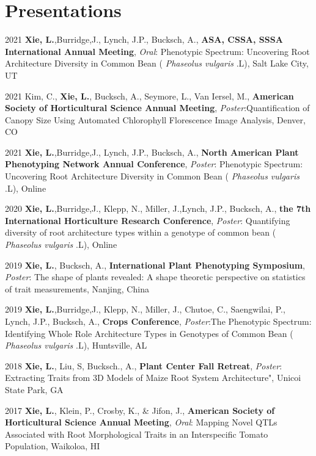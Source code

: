 \documentclass[11pt,a4paper,]{awesome-cv}
\begin{document}
\hypertarget{presentations}{%
\section{Presentations}\label{presentations}}

2021 \textbf{Xie, L.},Burridge,J., Lynch, J.P., Bucksch, A.,
\textbf{ASA, CSSA, SSSA International Annual Meeting}, \emph{Oral}:
Phenotypic Spectrum: Uncovering Root Architecture Diversity in Common
Bean ( \emph{Phaseolus vulgaris} .L), Salt Lake City, UT

2021 Kim, C., \textbf{Xie, L.}, Bucksch, A., Seymore, L., Van Iersel,
M., \textbf{American Society of Horticultural Science Annual Meeting},
\emph{Poster}:Quantification of Canopy Size Using Automated Chlorophyll
Florescence Image Analysis, Denver, CO

2021 \textbf{Xie, L.},Burridge,J., Lynch, J.P., Bucksch, A.,
\textbf{North American Plant Phenotyping Network Annual Conference},
\emph{Poster}: Phenotypic Spectrum: Uncovering Root Architecture
Diversity in Common Bean ( \emph{Phaseolus vulgaris} .L), Online

2020 \textbf{Xie, L.},Burridge,J., Klepp, N., Miller, J.,Lynch, J.P.,
Bucksch, A., \textbf{the 7th International Horticulture Research
Conference}, \emph{Poster}: Quantifying diversity of root architecture
types within a genotype of common bean ( \emph{Phaseolus vulgaris} .L),
Online

2019 \textbf{Xie, L.}, Bucksch, A., \textbf{International Plant
Phenotyping Symposium}, \emph{Poster}: The shape of plants revealed: A
shape theoretic perspective on statistics of trait measurements,
Nanjing, China

2019 \textbf{Xie, L.},Burridge,J., Klepp, N., Miller, J., Chutoe, C.,
Saengwilai, P., Lynch, J.P., Bucksch, A., \textbf{Crops Conference},
\emph{Poster}:The Phenotypic Spectrum: Identifying Whole Role
Architecture Types in Genotypes of Common Bean ( \emph{Phaseolus
vulgaris} .L), Huntsville, AL

2018 \textbf{Xie, L.}, Liu, S, Bucksch., A., \textbf{Plant Center Fall
Retreat}, \emph{Poster}: Extracting Traits from 3D Models of Maize Root
System Architecture", Unicoi State Park, GA

2017 \textbf{Xie, L.}, Klein, P., Crosby, K., \& Jifon, J.,
\textbf{American Society of Horticultural Science Annual Meeting},
\emph{Oral}: Mapping Novel QTLs Associated with Root Morphological
Traits in an Interspecific Tomato Population, Waikoloa, HI
\end{document}

